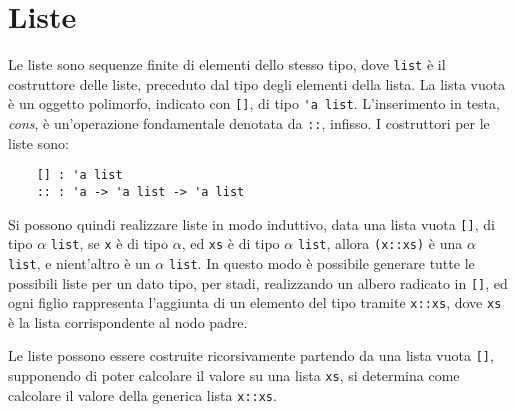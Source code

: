 \documentclass{article}
\numberwithin{equation}{subsection}
\begin{document}
\clearpage

\section{Liste}



Le liste sono sequenze finite di elementi dello stesso tipo, dove \verb|list| è il costruttore delle liste, preceduto dal tipo degli elementi della lista. La lista vuota è un oggetto polimorfo, indicato con \verb|[]|, di tipo \verb|'a list|. L'inserimento in testa, \textit{cons}, è un'operazione fondamentale denotata da \verb|::|, infisso. I costruttori per le liste sono:
\begin{verbatim} 
    [] : 'a list
    :: : 'a -> 'a list -> 'a list
\end{verbatim}
Si possono quindi realizzare liste in modo induttivo, data una lista vuota \verb|[]|, di tipo $\alpha$ \verb|list|, se \verb|x| è di tipo $\alpha$, ed \verb|xs| è di tipo $\alpha$ \verb|list|, allora \verb|(x::xs)| è una $\alpha$ \verb|list|, e nient'altro è un $\alpha$ \verb|list|. 
In questo modo è possibile generare tutte le possibili liste per un dato tipo, per stadi, realizzando un albero radicato in \verb|[]|, ed ogni figlio rappresenta l'aggiunta di un elemento del tipo tramite \verb|x::xs|, dove \verb|xs| è la lista corrispondente al nodo padre. 

Le liste possono essere costruite ricorsivamente partendo da una lista vuota \verb|[]|, supponendo di poter calcolare il valore su una lista \verb|xs|, si determina come calcolare il valore della generica lista \verb|x::xs|. 
\end{document}
